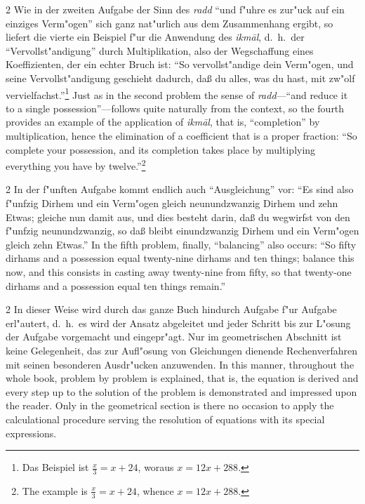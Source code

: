\documentclass[10pt,a4paper]{article}
\renewcommand{\switchcolumn}{\syncronize\nointerlineskip\columnbreak}
\newcommand{\enquote}[1]{``#1''}
\begin{document}
\begin{paracol}{2}
Wie in der zweiten Aufgabe der Sinn des \textit{radd} \enquote{und f"uhre es zur"uck auf ein einziges Verm"ogen} sich ganz nat"urlich aus dem Zusammenhang ergibt, so liefert die vierte ein Beispiel f"ur die Anwendung des \textit{ikm\=al}, d.\ h.\ der \enquote{Vervollst"andigung} durch Multiplikation, also der Wegschaffung eines Koeffizienten, der ein echter Bruch ist: \enquote{So vervollst"andige dein Verm"ogen, und seine Vervollst"andigung geschieht dadurch, da\ss{} du alles, was du hast, mit zw"olf vervielfachst.}\footnote{Das Beispiel ist $\frac{x}{3} = x + 24$, woraus $x = 12x + 288$.}
\switchcolumn
Just as in the second problem the sense of \textit{radd}---``and reduce it to a single possession''---follows quite naturally from the context, so the fourth provides an example of the application of \textit{ikm\=al}, that is, ``completion'' by multiplication, hence the elimination of a coefficient that is a proper fraction: ``So complete your possession, and its completion takes place by multiplying everything you have by twelve.''\footnote{The example is $\frac{x}{3} = x + 24$, whence $x = 12x + 288$.}
\end{paracol}

\begin{paracol}{2}
In der f"unften Aufgabe kommt endlich auch \enquote{Ausgleichung} vor: \enquote{Es sind also f"unfzig Dirhem und ein Verm"ogen gleich neunundzwanzig Dirhem und zehn Etwas; gleiche nun damit aus, und dies besteht darin, da\ss{} du wegwirfst von den f"unfzig neunundzwanzig, so da\ss{} bleibt einundzwanzig Dirhem und ein Verm"ogen gleich zehn Etwas.}
\switchcolumn
In the fifth problem, finally, ``balancing'' also occurs: ``So fifty dirhams and a possession equal twenty-nine dirhams and ten things; balance this now, and this consists in casting away twenty-nine from fifty, so that twenty-one dirhams and a possession equal ten things remain.''
\end{paracol}

\begin{paracol}{2}
In dieser Weise wird durch das ganze Buch hindurch Aufgabe f"ur Aufgabe erl"autert, d.\ h.\ es wird der Ansatz abgeleitet und jeder Schritt bis zur L"osung der Aufgabe vorgemacht und eingepr"agt. Nur im geometrischen Abschnitt ist keine Gelegenheit, das zur Aufl"osung von Gleichungen dienende Rechenverfahren mit seinen besonderen Ausdr"ucken anzuwenden.
\switchcolumn
In this manner, throughout the whole book, problem by problem is explained, that is, the equation is derived and every step up to the solution of the problem is demonstrated and impressed upon the reader. Only in the geometrical section is there no occasion to apply the calculational procedure serving the resolution of equations with its special expressions.
\end{paracol}
\end{document}
